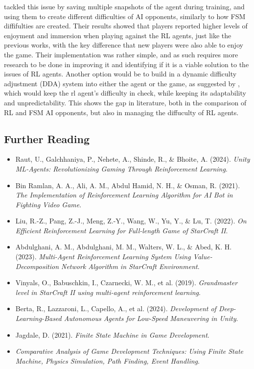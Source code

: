\documentclass[conference]{IEEEtran}
\begin{document}
\cite{grech_creating_2023} tackled this issue by saving multiple snapshots of the agent during training, and using them to create different difficulties of AI opponents, similarly to how FSM diffifulties are created.
Their results showed that players reported higher levels of enjoyment and immersion when playing against the RL agents, just like the previous works, with the key difference that new players were also able to enjoy
the game. Their implementation was rather simple, and as such requires more research to be done in improving it and identifying if it is a viable solution to the issues of RL agents. Another option would be
to build in a dynamic difficulty adjustment (DDA) system into either the agent or the game, as suggested by \cite{grech_creating_2023}, which would keep the rl agent's difficulty in check, while keeping its
adaptability and unpredictability. This shows the gap in literature, both in the comparison of RL and FSM AI opponents, but also in managing the diffuculty of RL agents.

\subsection{Further Reading}

\begin{itemize}
    \item Raut, U., Galchhaniya, P., Nehete, A., Shinde, R., \& Bhoite, A. (2024). \textit{Unity ML-Agents: Revolutionizing Gaming Through Reinforcement Learning}. \cite{raut_unity_2024}
    \item Bin Ramlan, A. A., Ali, A. M., Abdul Hamid, N. H., \& Osman, R. (2021). \textit{The Implementation of Reinforcement Learning Algorithm for AI Bot in Fighting Video Game}. \cite{bin_ramlan_implementation_2021}
    \item Liu, R.-Z., Pang, Z.-J., Meng, Z.-Y., Wang, W., Yu, Y., \& Lu, T. (2022). \textit{On Efficient Reinforcement Learning for Full-length Game of StarCraft II}. \cite{liu_efficient_2022}
    \item Abdulghani, A. M., Abdulghani, M. M., Walters, W. L., \& Abed, K. H. (2023). \textit{Multi-Agent Reinforcement Learning System Using Value-Decomposition Network Algorithm in StarCraft Environment}. \cite{abdulghani_multi-agent_2023}
    \item Vinyals, O., Babuschkin, I., Czarnecki, W. M., et al. (2019). \textit{Grandmaster level in StarCraft II using multi-agent reinforcement learning}. \cite{vinyals_grandmaster_2019}
    \item Berta, R., Lazzaroni, L., Capello, A., et al. (2024). \textit{Development of Deep-Learning-Based Autonomous Agents for Low-Speed Maneuvering in Unity}. \cite{berta_development_2024}
    \item Jagdale, D. (2021). \textit{Finite State Machine in Game Development}. \cite{jagdale_finite_2021}
    \item \textit{Comparative Analysis of Game Development Techniques: Using Finite State Machine, Physics Simulation, Path Finding, Event Handling}. \cite{noauthor_comparative_nodate}
\end{itemize}
\end{document}
